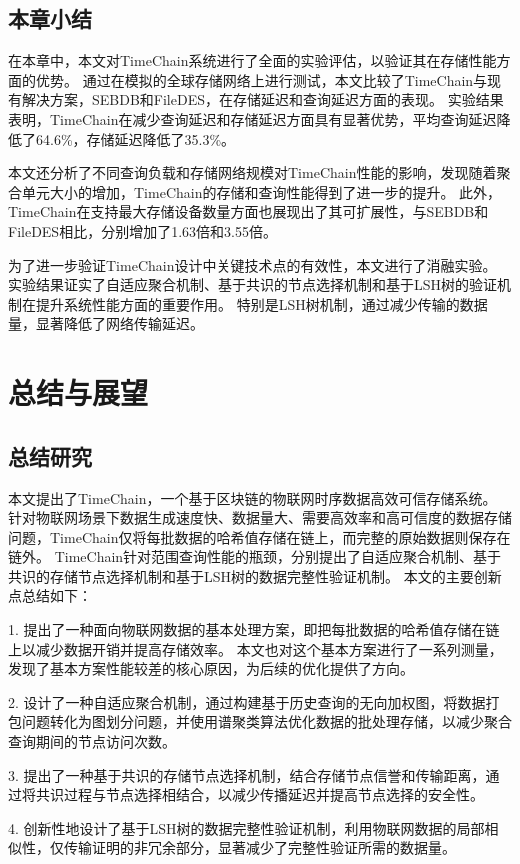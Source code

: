 \section{本章小结}
在本章中，本文对TimeChain系统进行了全面的实验评估，以验证其在存储性能方面的优势。
通过在模拟的全球存储网络上进行测试，本文比较了TimeChain与现有解决方案，SEBDB和FileDES，在存储延迟和查询延迟方面的表现。
实验结果表明，TimeChain在减少查询延迟和存储延迟方面具有显著优势，平均查询延迟降低了64.6\%，存储延迟降低了35.3\%。

本文还分析了不同查询负载和存储网络规模对TimeChain性能的影响，发现随着聚合单元大小的增加，TimeChain的存储和查询性能得到了进一步的提升。
此外，TimeChain在支持最大存储设备数量方面也展现出了其可扩展性，与SEBDB和FileDES相比，分别增加了1.63倍和3.55倍。

为了进一步验证TimeChain设计中关键技术点的有效性，本文进行了消融实验。
实验结果证实了自适应聚合机制、基于共识的节点选择机制和基于LSH树的验证机制在提升系统性能方面的重要作用。
特别是LSH树机制，通过减少传输的数据量，显著降低了网络传输延迟。

\chapter{总结与展望}

\section{总结研究}
本文提出了TimeChain，一个基于区块链的物联网时序数据高效可信存储系统。
针对物联网场景下数据生成速度快、数据量大、需要高效率和高可信度的数据存储问题，TimeChain仅将每批数据的哈希值存储在链上，而完整的原始数据则保存在链外。
TimeChain针对范围查询性能的瓶颈，分别提出了自适应聚合机制、基于共识的存储节点选择机制和基于LSH树的数据完整性验证机制。
本文的主要创新点总结如下：

1. 提出了一种面向物联网数据的基本处理方案，即把每批数据的哈希值存储在链上以减少数据开销并提高存储效率。
本文也对这个基本方案进行了一系列测量，发现了基本方案性能较差的核心原因，为后续的优化提供了方向。

2. 设计了一种自适应聚合机制，通过构建基于历史查询的无向加权图，将数据打包问题转化为图划分问题，并使用谱聚类算法优化数据的批处理存储，以减少聚合查询期间的节点访问次数。

3. 提出了一种基于共识的存储节点选择机制，结合存储节点信誉和传输距离，通过将共识过程与节点选择相结合，以减少传播延迟并提高节点选择的安全性。

4. 创新性地设计了基于LSH树的数据完整性验证机制，利用物联网数据的局部相似性，仅传输证明的非冗余部分，显著减少了完整性验证所需的数据量。

